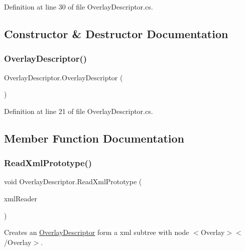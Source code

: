 Definition at line 30 of file Overlay\+Descriptor.\+cs.



\subsection{Constructor \& Destructor Documentation}
\mbox{\label{class_overlay_descriptor_a518174908981876ab479afd8c47544c2}} 
\subsubsection{\texorpdfstring{Overlay\+Descriptor()}{OverlayDescriptor()}}
{\footnotesize\ttfamily Overlay\+Descriptor.\+Overlay\+Descriptor (\begin{DoxyParamCaption}{ }\end{DoxyParamCaption})}



Definition at line 21 of file Overlay\+Descriptor.\+cs.



\subsection{Member Function Documentation}
\mbox{\label{class_overlay_descriptor_ad20c8b4b4817e2bea919a3619401ef38}} 
\subsubsection{\texorpdfstring{Read\+Xml\+Prototype()}{ReadXmlPrototype()}}
{\footnotesize\ttfamily void Overlay\+Descriptor.\+Read\+Xml\+Prototype (\begin{DoxyParamCaption}\item[{Xml\+Reader}]{xml\+Reader }\end{DoxyParamCaption})}



Creates an \hyperlink{class_overlay_descriptor}{Overlay\+Descriptor} form a xml subtree with node $<$Overlay$>$$<$/\+Overlay$>$. 


